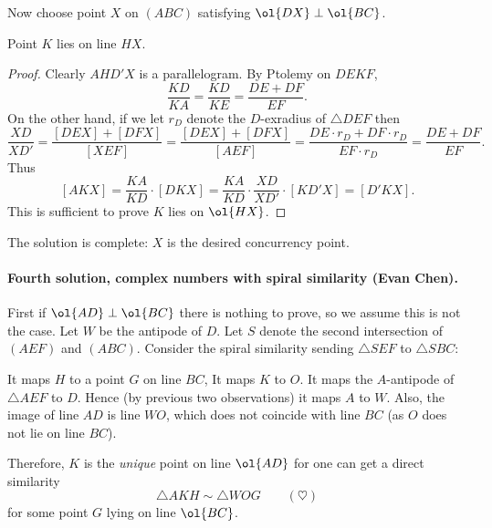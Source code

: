 Now choose point $X$ on $(ABC)$ satisfying $\ol{DX} \perp \ol{BC}$.
\begin{claim*}
  Point $K$ lies on line $HX$.
\end{claim*}
\begin{proof}
  Clearly $AHD'X$ is a parallelogram.
  By Ptolemy on $DEKF$,
  \[\frac{KD}{KA} = \frac{KD}{KE} = \frac{DE + DF}{EF}.\]
  On the other hand,
  if we let $r_D$ denote the $D$-exradius of $\triangle DEF$ then
  \[\frac{XD}{XD'}
    = \frac{[DEX] + [DFX]}{[XEF]}
    = \frac{[DEX] + [DFX]}{[AEF]}
    = \frac{DE \cdot r_D + DF \cdot r_D}{EF \cdot r_D}
  = \frac{DE + DF}{EF}. \]
  Thus
  \[[AKX] = \frac{KA}{KD} \cdot [DKX]
    = \frac{KA}{KD} \cdot \frac{XD}{XD'} \cdot [KD'X]
    = [D'KX].\]
  This is sufficient to prove $K$ lies on $\ol{HX}$.
\end{proof}
The solution is complete: $X$ is the desired concurrency point.

\paragraph{Fourth solution, complex numbers with spiral similarity (Evan Chen).}
First if $\ol{AD} \perp \ol{BC}$ there is nothing to prove,
so we assume this is not the case.
Let $W$ be the antipode of $D$.
Let $S$ denote the second intersection of $(AEF)$ and $(ABC)$.
Consider the spiral similarity sending $\triangle SEF$ to $\triangle SBC$:
\begin{itemize}
  \ii It maps $H$ to a point $G$ on line $BC$,
  \ii It maps $K$ to $O$.
  \ii It maps the $A$-antipode of $\triangle AEF$ to $D$.
  \ii Hence (by previous two observations) it maps $A$ to $W$.
  \ii Also, the image of line $AD$ is line $WO$,
  which does not coincide with line $BC$
  (as $O$ does not lie on line $BC$).
\end{itemize}
Therefore, $K$ is the \emph{unique} point on line $\ol{AD}$
for one can get a direct similarity
\[ \triangle AKH \sim \triangle WOG \qquad(\heartsuit) \]
for some point $G$ lying on line $\ol{BC}$.

